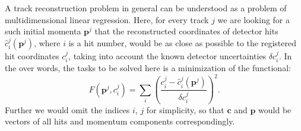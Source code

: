 %
%

A track reconstruction  problem in general can be understood as a problem of multidimensional linear regression.
Here, for every track $j$ we are looking for a such initial momenta $\boldsymbol{p}^j$ that the reconstructed coordinates of detector 
hits $\hat{c}_i^j(\boldsymbol{p}^j)$, where $i$ is a hit number, would be as close as possible to the registered hit coordinates $c_i^j$, 
taking into account the known detector uncertainties $\delta c_i^j$.
In the over words, the tasks to be solved here is a minimization of the functional:
\begin{equation}
\label{track_fit}
F(\boldsymbol{p}^j, c_i^j) = \sum_i \left(\frac{c_i^j - \hat{c}_i^j(\boldsymbol{p}^j)}{\delta c_i^j}\right)^2.
\end{equation}
Further we would omit the indices $i$, $j$ for simplicity, so that $\boldsymbol{c}$ and $\boldsymbol{p}$ would be vectors of all hits and momentum components correspondingly.


